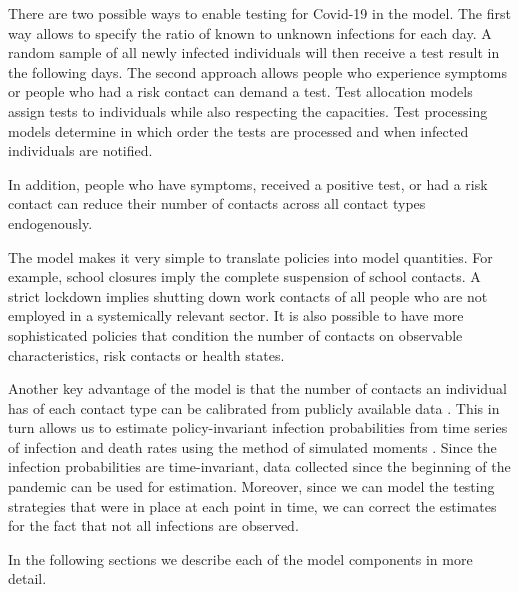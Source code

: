 There are two possible ways to enable testing for Covid-19 in the model. The first way allows to specify the ratio of known to unknown infections for each day. A random sample of all newly infected individuals will then receive a test result in the following days. The second approach allows people who experience symptoms or people who had a risk contact can demand a test. Test allocation models assign tests to individuals while also respecting the capacities. Test processing models determine in which order the tests are processed and when infected individuals are notified.

In addition, people who have symptoms, received a positive test, or had a risk contact can reduce their number of contacts across all contact types endogenously.

The model makes it very simple to translate policies into model quantities. For example, school closures imply the complete suspension of school contacts. A strict lockdown implies shutting down work contacts of all people who are not employed in a systemically relevant sector. It is also possible to have more sophisticated policies that condition the number of contacts on observable characteristics, risk contacts or health states.

Another key advantage of the model is that the number of contacts an individual has of each contact type can be calibrated from publicly available data \citep{Mossong2008}. This in turn allows us to estimate policy-invariant infection probabilities from time series of infection and death rates using the method of simulated moments \citep{McFadden1989}. Since the infection probabilities are time-invariant, data collected since the beginning of the pandemic can be used for estimation. Moreover, since we can model the testing strategies that were in place at each point in time, we can correct the estimates for the fact that not all infections are observed.

In the following sections we describe each of the model components in more detail.
